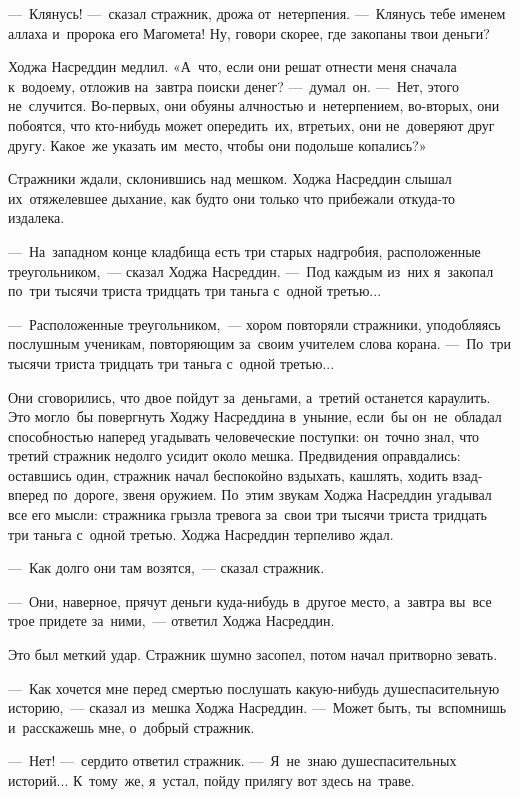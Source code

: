 \documentclass[12pt,a4paper]{book}
\begin{document}
—~Клянусь! —~сказал стражник, дрожа от~нетерпения. —~Клянусь тебе именем аллаха и~пророка его Магомета! Ну, говори скорее, где закопаны твои деньги?

Ходжа Насреддин медлил. «А~что, если они решат отнести меня сначала к~водоему, отложив на~завтра поиски денег? —~думал~он. —~Нет, этого не~случится. Во-первых, они обуяны алчностью и~нетерпением, во-вторых, они побоятся, что кто-нибудь может опередить~их, втретьих, они не~доверяют друг другу. Какое~же указать им~место, чтобы они подольше копались?»

Стражники ждали, склонившись над мешком. Ходжа Насреддин слышал их~отяжелевшее дыхание, как будто они только что прибежали откуда-то издалека.

—~На~западном конце кладбища есть три старых надгробия, расположенные треугольником,~— сказал Ходжа Насреддин. —~Под каждым из~них я~закопал по~три тысячи триста тридцать три таньга с~одной третью...

—~Расположенные треугольником,~— хором повторяли стражники, уподобляясь послушным ученикам, повторяющим за~своим учителем слова корана. —~По~три тысячи триста тридцать три таньга с~одной третью...

Они сговорились, что двое пойдут за~деньгами, а~третий останется караулить. Это могло~бы повергнуть Ходжу Насреддина в~уныние, если~бы он~не~обладал способностью наперед угадывать человеческие поступки: он~точно знал, что третий стражник недолго усидит около мешка. Предвидения оправдались: оставшись один, стражник начал беспокойно вздыхать, кашлять, ходить взад-вперед по~дороге, звеня оружием. По~этим звукам Ходжа Насреддин угадывал все его мысли: стражника грызла тревога за~свои три тысячи триста тридцать три таньга с~одной третью. Ходжа Насреддин терпеливо ждал.

—~Как долго они там возятся,~— сказал стражник.

—~Они, наверное, прячут деньги куда-нибудь в~другое место, а~завтра вы~все трое придете за~ними,~— ответил Ходжа Насреддин.

Это был меткий удар. Стражник шумно засопел, потом начал притворно зевать.

—~Как хочется мне перед смертью послушать какую-нибудь душеспасительную историю,~— сказал из~мешка Ходжа Насреддин. —~Может быть, ты~вспомнишь и~расскажешь мне, о~добрый стражник.

—~Нет! —~сердито ответил стражник. —~Я~не~знаю душеспасительных историй... К~тому~же, я~устал, пойду прилягу вот здесь на~траве.
\end{document}
